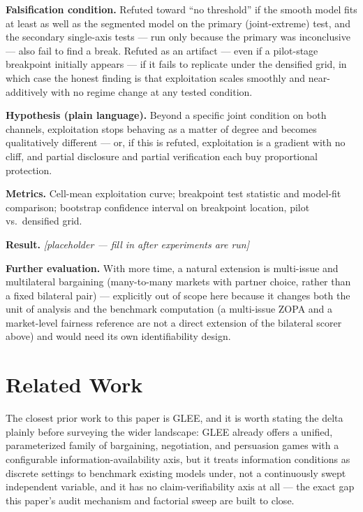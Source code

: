 \documentclass[11pt]{article}
\newcommand{\ph}{\textit{[placeholder --- fill in after experiments are run]}}
\begin{document}
\textbf{Falsification condition.} Refuted toward ``no threshold'' if the smooth model fits at least as well as the segmented model on the primary (joint-extreme) test, and the secondary single-axis tests --- run only because the primary was inconclusive --- also fail to find a break. Refuted as an artifact --- even if a pilot-stage breakpoint initially appears --- if it fails to replicate under the densified grid, in which case the honest finding is that exploitation scales smoothly and near-additively with no regime change at any tested condition.

\textbf{Hypothesis (plain language).} Beyond a specific joint condition on both channels, exploitation stops behaving as a matter of degree and becomes qualitatively different --- or, if this is refuted, exploitation is a gradient with no cliff, and partial disclosure and partial verification each buy proportional protection.

\textbf{Metrics.} Cell-mean exploitation curve; breakpoint test statistic and model-fit comparison; bootstrap confidence interval on breakpoint location, pilot vs.\ densified grid.

\textbf{Result.} \ph

\vspace{0.5em}
\noindent\textbf{Further evaluation.} With more time, a natural extension is multi-issue and multilateral bargaining (many-to-many markets with partner choice, rather than a fixed bilateral pair) --- explicitly out of scope here because it changes both the unit of analysis and the benchmark computation (a multi-issue ZOPA and a market-level fairness reference are not a direct extension of the bilateral scorer above) and would need its own identifiability design.

\section{Related Work}

The closest prior work to this paper is GLEE, and it is worth stating the delta plainly before surveying the wider landscape: GLEE already offers a unified, parameterized family of bargaining, negotiation, and persuasion games with a configurable information-availability axis, but it treats information conditions as discrete settings to benchmark existing models under, not a continuously swept independent variable, and it has no claim-verifiability axis at all --- the exact gap this paper's audit mechanism and factorial sweep are built to close.
\end{document}
